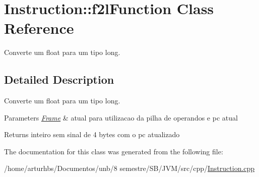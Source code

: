 \hypertarget{classInstruction_1_1f2lFunction}{}\section{Instruction\+:\+:f2l\+Function Class Reference}
\label{classInstruction_1_1f2lFunction}


Converte um float para um tipo long.  




\subsection{Detailed Description}
Converte um float para um tipo long. 


\begin{DoxyParams}{Parameters}
{\em \hyperlink{classFrame}{Frame}} & atual para utilizacao da pilha de operandos e pc atual \\
\hline
\end{DoxyParams}
\begin{DoxyReturn}{Returns}
inteiro sem sinal de 4 bytes com o pc atualizado 
\end{DoxyReturn}


The documentation for this class was generated from the following file\+:\begin{DoxyCompactItemize}
\item 
/home/arturhbs/\+Documentos/unb/8 semestre/\+S\+B/\+J\+V\+M/src/cpp/\hyperlink{Instruction_8cpp}{Instruction.\+cpp}\end{DoxyCompactItemize}
